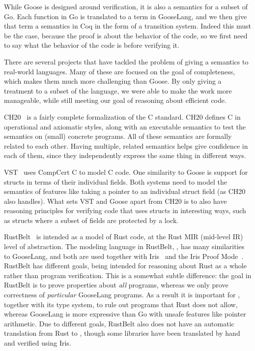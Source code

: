 
While Goose is designed around verification, it is also a semantics for a subset
of Go. Each function in Go is translated to a term in GooseLang, and we then
give that term a semantics in Coq in the form of a transition system. Indeed
this must be the case, because the proof is about the behavior of the code, so
we first need to say what the behavior of the code is before verifying it.

There are several projects that have tackled the problem of giving a semantics
to real-world languages. Many of these are focused on the goal of completeness,
which makes them much more challenging than Goose. By only giving a treatment to
a subset of the language, we were able to make the work more manageable, while
still meeting our goal of reasoning about efficient code.

CH20~\cite{krebbers:c-coq} is a fairly complete formalization of the C standard.
CH20 defines C in operational and axiomatic styles, along with an executable
semantics to test the semantics on (small) concrete programs. All of these
semantics are formally related to each other. Having multiple, related semantics
helps give confidence in each of them, since they independently express the same
thing in different ways.

VST~\cite{cao:vst-floyd} uses CompCert C to model C code. One similarity to
Goose is support for structs in terms of their individual fields. Both systems
need to model the semantics of features like taking a pointer to an individual
struct field (as CH20 also handles). What sets VST and Goose apart from CH20 is
to also have reasoning principles for verifying code that uses structs in
interesting ways, such as structs where a subset of fields are protected by a
lock.

RustBelt~\cite{jung:rustbelt} is intended as a model of Rust code, at the Rust
MIR (mid-level IR) level of abstraction. The modeling language in RustBelt,
\lambdarust, has many similarities to GooseLang, and both are used together with
Iris~\cite{jung:iris-1} and the Iris Proof Mode~\cite{krebbers:ipm}. RustBelt
has different goals, being intended for reasoning about Rust as a whole rather
than program verification. This is a somewhat subtle difference: the goal in
RustBelt is to prove properties about \emph{all} \lambdarust programs, whereas
we only prove correctness of \emph{particular} GooseLang programs. As a result
it is important for \lambdarust, together with its type system, to rule out
programs that Rust does not allow, whereas GooseLang is more expressive than Go
with unsafe features like pointer arithmetic. Due to different goals, RustBelt
also does not have an automatic translation from Rust to \lambdarust, though
some libraries have been translated by hand and verified using Iris.

